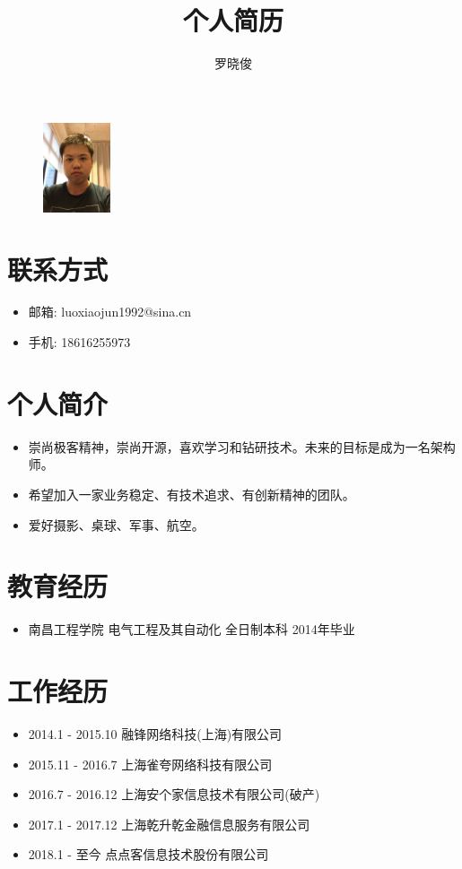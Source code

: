 \documentclass[a4paper,12pt]{article}
\title{个人简历}
\author{罗晓俊}
\begin{document}
	\begin{CJK}{UTF8}{gbsn}

		\maketitle{}

		\begin{figure}[h]
			\centering\includegraphics[height=100px]{webwxgetmsgimg.jpeg}
		\end{figure}

		\section{联系方式}
			\begin{itemize}
				\item{邮箱: luoxiaojun1992@sina.cn}
				\item{手机: 18616255973}
			\end{itemize}

		\section{个人简介}
			\begin{itemize}
				\item{崇尚极客精神，崇尚开源，喜欢学习和钻研技术。未来的目标是成为一名架构师。}
				\item{希望加入一家业务稳定、有技术追求、有创新精神的团队。}
				\item{爱好摄影、桌球、军事、航空。}
			\end{itemize}
		
		\section{教育经历}
			\begin{itemize}
				\item{南昌工程学院 电气工程及其自动化 全日制本科 2014年毕业}
			\end{itemize}
		
		\section{工作经历}
			\begin{itemize}
				\item{2014.1 - 2015.10 融锋网络科技(上海)有限公司}
				\item{2015.11 - 2016.7 上海雀夸网络科技有限公司}
				\item{2016.7 - 2016.12 上海安个家信息技术有限公司(破产)}
				\item{2017.1 - 2017.12 上海乾升乾金融信息服务有限公司}
				\item{2018.1 - 至今 点点客信息技术股份有限公司}
			\end{itemize}
		

\end{CJK}
\end{document}
